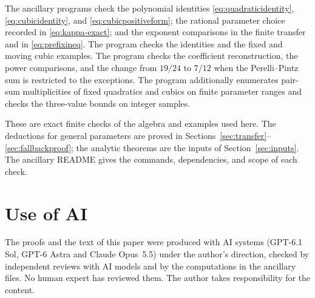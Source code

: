 \documentclass[11pt]{article}
\theoremstyle{definition}
\theoremstyle{remark}
\numberwithin{equation}{section}
\begin{document}
The ancillary programs check the polynomial identities
\eqref{eq:quadraticidentity}, \eqref{eq:cubicidentity}, and
\eqref{eq:cubicpositiveform}; the rational parameter choice recorded
in \eqref{eq:kappa-exact}; and the exponent comparisons in the
finite transfer and in \eqref{eq:prefixineq}.
The program  checks the identities and
the fixed and moving cubic examples. The program
 checks the coefficient reconstruction,
the power comparisons, and the change from $19/24$ to $7/12$ when
the Perelli--Pintz sum is restricted to the exceptions.
The program  additionally enumerates
pair-sum multiplicities of fixed quadratics and cubics on finite
parameter ranges and checks the three-value bounds on integer samples.

These are exact finite checks of the algebra and examples used here.
The deductions for general parameters are proved in
Sections~\ref{sec:transfer}--\ref{sec:fallbackproof}; the analytic
theorems are the inputs of Section~\ref{sec:inputs}.
The ancillary README gives the commands, dependencies, and scope of
each check.




\section*{Use of AI}
The proofs and the text of this paper were produced with AI systems
(GPT-6.1 Sol, GPT-6 Astra and Claude Opus~5.5) under the author's
direction, checked by independent reviews with AI models and by the
computations in the ancillary files. No human expert has reviewed
them. The author takes responsibility for the content.
\end{document}
